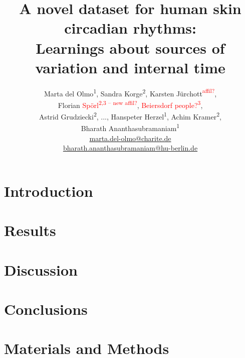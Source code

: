 \documentclass[twoside]{article} %
\title{
	A novel dataset for human skin circadian rhythms: \\[.1ex]
	Learnings about sources of variation and internal time} %
\author{%
	Marta del Olmo\textsuperscript{1}, Sandra Korge\textsuperscript{2}, Karsten J\"urchott\textcolor{red}{\textsuperscript{affil?}}, \\[.1ex]
	Florian \textcolor{red}{Sp\"orl\textsuperscript{2,3 -- new affil?}}, \textcolor{red}{Beiersdorf people?\textsuperscript{3}}, \\[.1ex]
	Astrid Grudziecki\textsuperscript{2}, ..., Hanspeter Herzel\textsuperscript{1}, Achim Kramer\textsuperscript{2},\\[.1ex]
	Bharath Ananthasubramaniam\textsuperscript{1}\\[1ex]
\normalsize \href{mailto:marta.del-olmo@charite.de}{marta.del-olmo@charite.de} \\
\normalsize \href{mailto:bharath.ananthasubramaniam@hu-berlin.de}{bharath.ananthasubramaniam@hu-berlin.de} %
}
\date{} %
\begin{document}
\maketitle


\section{Introduction}



\section{Results}


\section{Discussion}


\section{Conclusions}

\newpage
\section{Materials and Methods}

\newpage
\section*{}

\newpage
\setcounter{table}{0}
\setcounter{figure}{0}
\renewcommand{\thetable}{S\arabic{table}}%
\renewcommand{\thefigure}{S\arabic{figure}}%
\end{document}
